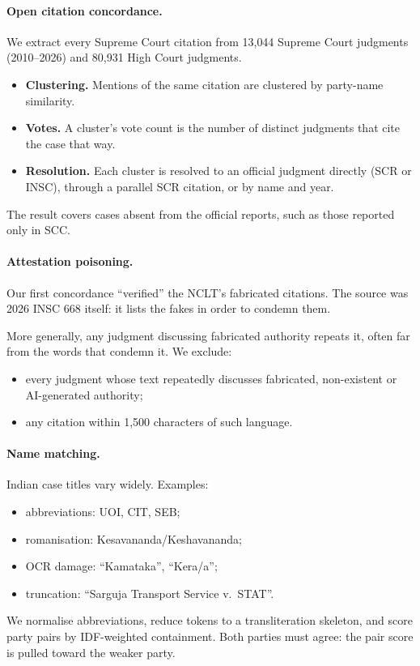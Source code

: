 \documentclass[sigconf,nonacm]{acmart}
\newcommand{\nMinedSC}{13{,}044}
\newcommand{\nMinedHC}{80{,}931}
\begin{document}
\paragraph{Open citation concordance.}
We extract every Supreme Court citation from \nMinedSC{} Supreme Court judgments (2010--2026) and
\nMinedHC{} High Court judgments.
\begin{itemize}
\item \textbf{Clustering.} Mentions of the same citation are clustered by party-name similarity.
\item \textbf{Votes.} A cluster's vote count is the number of distinct judgments that cite the case
that way.
\item \textbf{Resolution.} Each cluster is resolved to an official judgment directly (SCR or INSC),
through a parallel SCR citation, or by name and year.
\end{itemize}
The result covers cases absent from the official reports, such as those reported only in SCC.

\paragraph{Attestation poisoning.}
Our first concordance ``verified'' the NCLT's fabricated citations. The source was 2026 INSC 668
itself: it lists the fakes in order to condemn them.

More generally, any judgment discussing fabricated authority repeats it, often far from the words
that condemn it. We exclude:
\begin{itemize}
\item every judgment whose text repeatedly discusses fabricated, non-existent or AI-generated
authority;
\item any citation within 1,500 characters of such language.
\end{itemize}

\paragraph{Name matching.}
Indian case titles vary widely. Examples:
\begin{itemize}
\item abbreviations: UOI, CIT, SEB;
\item romanisation: Kesavananda/Keshavananda;
\item OCR damage: ``Kamataka'', ``Kera/a'';
\item truncation: ``Sarguja Transport Service v.\ STAT''.
\end{itemize}
We normalise abbreviations, reduce tokens to a transliteration skeleton, and score party pairs by
IDF-weighted containment. Both parties must agree: the pair score is pulled toward the weaker party.
\end{document}
